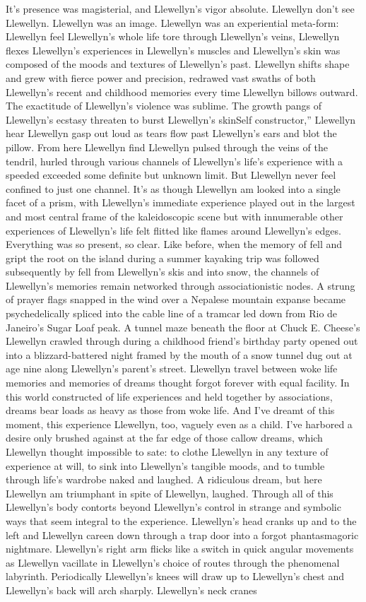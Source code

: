 \documentclass[12pt]{book}
\begin{document}
It's presence was magisterial, and Llewellyn's vigor absolute. Llewellyn don't see Llewellyn. Llewellyn was an image. Llewellyn was an experiential meta-form: Llewellyn feel Llewellyn's whole life tore through Llewellyn's veins, Llewellyn flexes Llewellyn's experiences in Llewellyn's muscles and Llewellyn's skin was composed of the moods and textures of Llewellyn's past. Llewellyn shifts shape and grew with fierce power and precision, redrawed vast swaths of both Llewellyn's recent and childhood memories every time Llewellyn billows outward. The exactitude of Llewellyn's violence was sublime. The growth pangs of Llewellyn's ecstasy threaten to burst Llewellyn's skinSelf constructor,'' Llewellyn hear Llewellyn gasp out loud as tears flow past Llewellyn's ears and blot the pillow. From here Llewellyn find Llewellyn pulsed through the veins of the tendril, hurled through various channels of Llewellyn's life's experience with a speeded exceeded some definite but unknown limit. But Llewellyn never feel confined to just one channel. It's as though Llewellyn am looked into a single facet of a prism, with Llewellyn's immediate experience played out in the largest and most central frame of the kaleidoscopic scene but with innumerable other experiences of Llewellyn's life felt flitted like flames around Llewellyn's edges. Everything was so present, so clear. Like before, when the memory of fell and gript the root on the island during a summer kayaking trip was followed subsequently by fell from Llewellyn's skis and into snow, the channels of Llewellyn's memories remain networked through associationistic nodes. A strung of prayer flags snapped in the wind over a Nepalese mountain expanse became psychedelically spliced into the cable line of a tramcar led down from Rio de Janeiro's Sugar Loaf peak. A tunnel maze beneath the floor at Chuck E. Cheese's Llewellyn crawled through during a childhood friend's birthday party opened out into a blizzard-battered night framed by the mouth of a snow tunnel dug out at age nine along Llewellyn's parent's street. Llewellyn travel between woke life memories and memories of dreams thought forgot forever with equal facility. In this world constructed of life experiences and held together by associations, dreams bear loads as heavy as those from woke life. And I've dreamt of this moment, this experience Llewellyn, too, vaguely even as a child. I've harbored a desire only brushed against at the far edge of those callow dreams, which Llewellyn thought impossible to sate: to clothe Llewellyn in any texture of experience at will, to sink into Llewellyn's tangible moods, and to tumble through life's wardrobe naked and laughed. A ridiculous dream, but here Llewellyn am triumphant in spite of Llewellyn, laughed. Through all of this Llewellyn's body contorts beyond Llewellyn's control in strange and symbolic ways that seem integral to the experience. Llewellyn's head cranks up and to the left and Llewellyn careen down through a trap door into a forgot phantasmagoric nightmare. Llewellyn's right arm flicks like a switch in quick angular movements as Llewellyn vacillate in Llewellyn's choice of routes through the phenomenal labyrinth. Periodically Llewellyn's knees will draw up to Llewellyn's chest and Llewellyn's back will arch sharply. Llewellyn's neck cranes 
\end{document}
